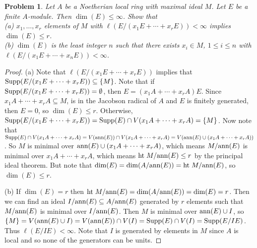 \documentclass{article}
\newcommand{\ann}{\textup{ann}}
\newcommand{\Ht}{\textup{ht}\;}
\newcommand{\supp}{\textup{Supp}}
\newtheorem{problem}{Problem}
\begin{document}
\begin{problem}
Let $A$ be a Noetherian local ring with maximal ideal $M$. Let $E$ be a finite $A$-module. Then $\dim(E) \leq \infty$. Show that\\
(a) $x_1, \dots , x_r$ elements of $M$ with $\ell (E/(x_1 E + \cdots + x_r E)) < \infty$ implies $\dim(E) \leq r$.\\
(b) $\dim(E)$ is the least integer $n$ such that there exists $x_i \in M$, $1 \leq i \leq n$ with $\ell(E/(x_1E + \cdots + x_nE)) < \infty$.
\end{problem}
\begin{proof}
(a) Note that $\ell(E/(x_1E + \cdots + x_rE))$ implies that $\supp(E/(x_1E + \cdots + x_rE)) \subseteq \{M\}$. Note that if $\supp(E/(x_1E + \cdots + x_rE)) = \emptyset$, then $E = (x_1A + \cdots + x_rA)E$. Since $x_1A + \cdots + x_rA \subseteq M$, is in the Jacobson radical of $A$ and $E$ is finitely generated, then $E = 0$, so $\dim(E) \leq r$. Otherwise, $\supp(E/(x_1E + \cdots + x_rE)) = \supp(E) \cap V(x_1A + \cdots + x_rA) = \{M\}$. Now note that $\supp(E) \cap V(x_1A + \cdots + x_rA) = V(\ann(E)) \cap V(x_1A + \cdots + x_rA) = V(\ann(E) \cup (x_1A + \cdots + x_rA))$. So $M$ is minimal over $\ann(E) \cup (x_1A + \cdots + x_rA)$, which means $M/\ann(E)$ is minimal over $x_1A + \cdots + x_rA$, which means $\Ht M/\ann(E) \leq r$ by the principal ideal theorem. But note that $\dim(E) = \dim(A/\ann(E)) = \Ht M/\ann(E)$, so $\dim(E) \leq r$.

(b) If $\dim(E) = r$ then $\Ht M/\ann(E) = \dim(A/\ann(E)) = \dim(E) = r$. Then we can find an ideal $I/\ann(E) \subseteq A/\ann(E)$ generated by $r$ elements such that $M/\ann(E)$ is minimal over $I/\ann(E)$. Then $M$ is minimal over $\ann(E) \cup I$, so $\{M\} = V(\ann(E) \cup I) = V(\ann(E)) \cap V(I) = \supp(E) \cap V(I) = \supp(E/IE)$. Thus $\ell(E/IE) < \infty$. Note that $I$ is generated by elements in $M$ since $A$ is local and so none of the generators can be units.
\end{proof}
\end{document}
